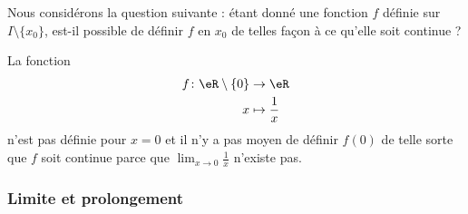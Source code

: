 Nous considérons la question suivante : étant donné une fonction \( f\) définie sur \( I\setminus\{ x_0 \}\), est-il possible de définir \( f\) en \( x_0\) de telles façon à ce qu'elle soit continue ?

\begin{example}
    La fonction
    \begin{equation}
        \begin{aligned}
            f\colon \eR\setminus\{ 0 \}&\to \eR \\
            x&\mapsto \frac{1}{ x }
        \end{aligned}
    \end{equation}
    n'est pas définie pour \( x=0\) et il n'y a pas moyen de définir \( f(0)\) de telle sorte que \( f\) soit continue parce que \( \lim_{x\to 0} \frac{1}{ x }\) n'existe pas.
\end{example}

\subsubsection{Limite et prolongement}

